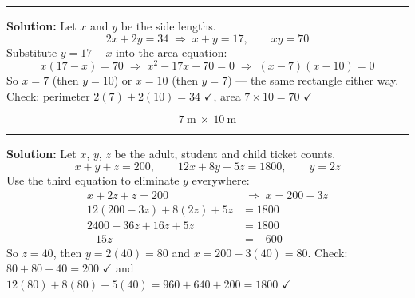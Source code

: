 \documentclass[12pt]{article}
\begin{document}
\vspace{0.2cm}\noindent\rule{\linewidth}{0.2pt}


\textbf{Solution:} Let $x$ and $y$ be the side lengths.
\[ 2x + 2y = 34 \;\Longrightarrow\; x + y = 17, \qquad xy = 70 \]
Substitute $y = 17 - x$ into the area equation:
\[ x(17 - x) = 70 \;\Longrightarrow\; x^2 - 17x + 70 = 0 \;\Longrightarrow\; (x - 7)(x - 10) = 0 \]
So $x = 7$ (then $y = 10$) or $x = 10$ (then $y = 7$) --- the same rectangle either way.
Check: perimeter $2(7) + 2(10) = 34$ $\checkmark$, area $7 \times 10 = 70$ $\checkmark$

\[ \boxed{7\ \text{m} \ \times \ 10\ \text{m}} \]

\vspace{0.2cm}\noindent\rule{\linewidth}{0.2pt}


\textbf{Solution:} Let $x$, $y$, $z$ be the adult, student and child ticket counts.
\[ x + y + z = 200, \qquad 12x + 8y + 5z = 1800, \qquad y = 2z \]
Use the third equation to eliminate $y$ everywhere:
\begin{align*}
  x + 2z + z = 200 &\;\Longrightarrow\; x = 200 - 3z \\
  12(200 - 3z) + 8(2z) + 5z &= 1800 \\
  2400 - 36z + 16z + 5z &= 1800 \\
  -15z &= -600
\end{align*}
So $z = 40$, then $y = 2(40) = 80$ and $x = 200 - 3(40) = 80$.
Check: $80 + 80 + 40 = 200$ $\checkmark$ and $12(80) + 8(80) + 5(40) = 960 + 640 + 200 = 1800$ $\checkmark$
\end{document}
